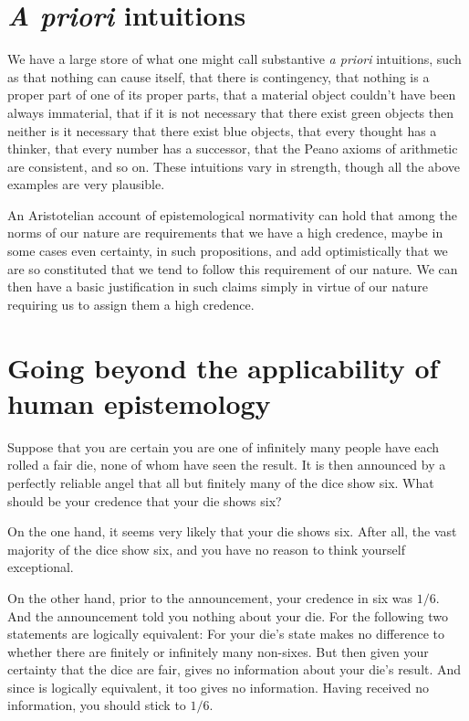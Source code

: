 \section{\textit{A priori} intuitions}
We have a large store of what one might call substantive \textit{a priori} intuitions, such as that nothing can cause itself,
that there is contingency, that nothing is a proper part of one of its proper parts, that a material object couldn't
have been always immaterial, that if it is not necessary that there exist green objects then neither is it necessary 
that there exist blue objects, that every thought has a thinker, that every number has a successor, that the Peano axioms 
of arithmetic are consistent, and so on. These intuitions vary in strength, though all the above examples are very plausible.

An Aristotelian account of epistemological normativity can hold that among the norms of our nature are requirements that we 
have a high credence, maybe in some cases even certainty, in such propositions, and add optimistically that we are so 
constituted that we tend to follow this requirement of our nature. We can then have a basic justification in such claims 
simply in virtue of our nature requiring us to assign them a high credence.

\section{Going beyond the applicability of human epistemology}
Suppose that you are certain you are one of infinitely many people have each rolled a fair die, none of whom have seen the 
result. It is then announced by a perfectly reliable angel that all but finitely many of the dice show six. 
What should be your credence that your die shows six? 

On the one hand, it seems very likely that your die shows six. After all, the vast majority of the dice show
six, and you have no reason to think yourself exceptional. 

On the other hand, prior to the announcement, your credence in six was $1/6$. And the announcement told you nothing 
about your die. For the following two statements are logically equivalent:
For your die's state makes no difference to whether there are finitely or infinitely many non-sixes.
But then given your certainty that the dice are fair,  gives no information about 
your die's result. And since  is logically equivalent, it too gives no information.
Having received no information, you should stick to $1/6$. 

